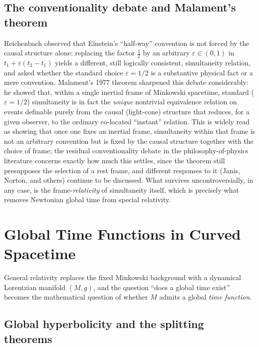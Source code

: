 \documentclass[11pt]{article}
\begin{document}
\subsection{The conventionality debate and Malament's theorem}

Reichenbach observed that Einstein's ``half-way'' convention is not forced by the causal structure alone: replacing the factor $\tfrac12$ by an arbitrary $\varepsilon\in(0,1)$ in $t_1+\varepsilon(t_2-t_1)$ yields a different, still logically consistent, simultaneity relation, and asked whether the standard choice $\varepsilon=1/2$ is a substantive physical fact or a mere convention. Malament's 1977 theorem sharpened this debate considerably: he showed that, within a single inertial frame of Minkowski spacetime, standard ($\varepsilon=1/2$) simultaneity is in fact the \emph{unique} nontrivial equivalence relation on events definable purely from the causal (light-cone) structure that reduces, for a given observer, to the ordinary co-located ``instant'' relation. This is widely read as showing that once one fixes an inertial frame, simultaneity within that frame is not an arbitrary convention but is fixed by the causal structure together with the choice of frame; the residual conventionality debate in the philosophy-of-physics literature concerns exactly how much this settles, since the theorem still presupposes the selection of a rest frame, and different responses to it (Janis, Norton, and others) continue to be discussed. What survives uncontroversially, in any case, is the frame-\emph{relativity} of simultaneity itself, which is precisely what removes Newtonian global time from special relativity.

\section{Global Time Functions in Curved Spacetime}
\label{sec:gr}

General relativity replaces the fixed Minkowski background with a dynamical Lorentzian manifold $(M,g)$, and the question ``does a global time exist'' becomes the mathematical question of whether $M$ admits a global \emph{time function}.

\subsection{Global hyperbolicity and the splitting theorems}
\label{ssec:gh}
\end{document}
